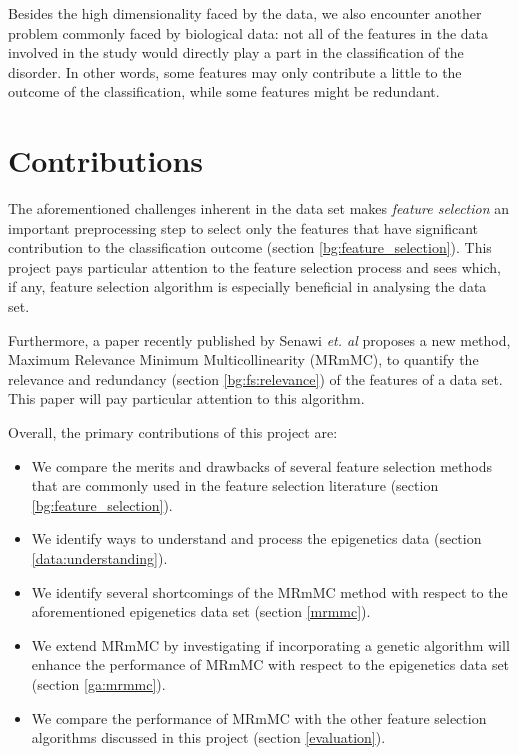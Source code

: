 \documentclass[12pt, twoside, a4paper]{report}
\begin{document}
Besides the high dimensionality faced by the data, we also encounter another problem commonly faced by biological data: not all of the features in the data involved in the study would directly play a part in the classification of the disorder. In other words, some features may only contribute a little to the outcome of the classification, while some features might be redundant.



\section{Contributions}
The aforementioned challenges inherent in the data set makes \textit{feature selection} an important preprocessing step to select only the features that have significant contribution to the classification outcome (section \ref{bg:feature_selection}). This project pays particular attention to the feature selection process and sees which, if any, feature selection algorithm is especially beneficial in analysing the data set.

Furthermore, a paper recently published by Senawi \textit{et. al} \cite{RefWorks:187} proposes a new method, Maximum Relevance Minimum Multicollinearity (MRmMC), to quantify the relevance and redundancy (section \ref{bg:fs:relevance}) of the features of a data set. This paper will pay particular attention to this algorithm.

Overall, the primary contributions of this project are:
\begin{itemize}
  \item We compare the merits and drawbacks of several feature selection methods that are commonly used in the feature selection literature (section \ref{bg:feature_selection}).
  \item We identify ways to understand and process the epigenetics data (section \ref{data:understanding}).
  \item We identify several shortcomings of the MRmMC method with respect to the aforementioned epigenetics data set (section \ref{mrmmc}).
  \item We extend MRmMC by investigating if incorporating a genetic algorithm will enhance the performance of MRmMC with respect to the epigenetics data set (section \ref{ga:mrmmc}).
  \item We compare the performance of MRmMC with the other feature selection algorithms discussed in this project (section \ref{evaluation}).
\end{itemize}
\end{document}
